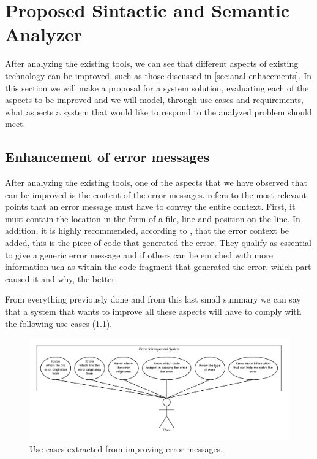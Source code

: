 \chapter{Proposed Sintactic and Semantic Analyzer}
\label{ch:proposed-sin-sema-anal}
After analyzing the existing tools, we can see that different
aspects of existing technology can be improved, such as those
discussed in \cref{sec:anal-enhacements}. In this section we will make a proposal
for a system solution, evaluating each of the aspects to be
improved and we will model, through use cases and requirements,
what aspects a system that would like to respond to the analyzed
problem should meet.

\section{Enhancement of error messages}
After analyzing the existing tools, one of the aspects that we have
observed that can be improved is the content of the error messages.
\cite{heeren2005top} refers to the most relevant points that an error message must
have to convey the entire context. First, it must contain the
location in the form of a file, line and position on the line.
In addition, it is highly recommended, according to \cite{heeren2005top}, that the
error context be added, this is the piece of code that generated
the error. They qualify as essential to give a generic error
message and if others can be enriched with more information 
uch as within the code fragment that generated the error,
which part caused it and why, the better.

From everything previously done and from this last small summary we can say
that a system that wants to improve all these aspects will have to comply
with the following use cases (\cref{fig:enh-err-use-case}).

\begin{figure}[h!]
    \includegraphics[scale=0.6]{images/enh-err-use-case.pdf}
    \centering
    \caption[Use cases extracted from improving error messages]{Use cases extracted from improving error messages.}
    \label{fig:enh-err-use-case}
\end{figure}

